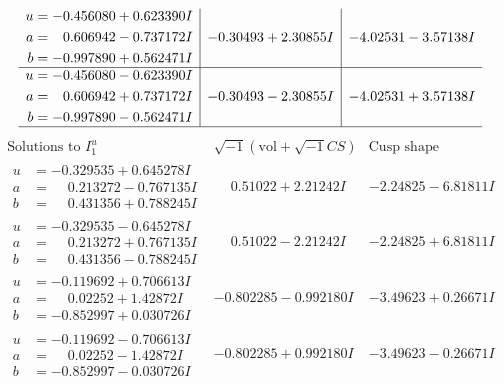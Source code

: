 \documentclass[1p]{elsarticle_modified}
\theoremstyle{definition}
\newcommand{\I}{\sqrt{-1}}
\begin{document}
$$\begin{array}{c|c|c}
\begin{aligned}
u &= -0.456080 + 0.623390 I \\
a &= \phantom{-}0.606942 - 0.737172 I \\
b &= -0.997890 + 0.562471 I\end{aligned}
 & -0.30493 + 2.30855 I & -4.02531 - 3.57138 I \\ \hline\begin{aligned}
u &= -0.456080 - 0.623390 I \\
a &= \phantom{-}0.606942 + 0.737172 I \\
b &= -0.997890 - 0.562471 I\end{aligned}
 & -0.30493 - 2.30855 I & -4.02531 + 3.57138 I\\
 \hline 
 \end{array}$$\newpage$$\begin{array}{c|c|c}  
\text{Solutions to }I^u_{1}& \I (\text{vol} + \sqrt{-1}CS) & \text{Cusp shape}\\
 \hline 
\begin{aligned}
u &= -0.329535 + 0.645278 I \\
a &= \phantom{-}0.213272 - 0.767135 I \\
b &= \phantom{-}0.431356 + 0.788245 I\end{aligned}
 & \phantom{-}0.51022 + 2.21242 I & -2.24825 - 6.81811 I \\ \hline\begin{aligned}
u &= -0.329535 - 0.645278 I \\
a &= \phantom{-}0.213272 + 0.767135 I \\
b &= \phantom{-}0.431356 - 0.788245 I\end{aligned}
 & \phantom{-}0.51022 - 2.21242 I & -2.24825 + 6.81811 I \\ \hline\begin{aligned}
u &= -0.119692 + 0.706613 I \\
a &= \phantom{-}0.02252 + 1.42872 I \\
b &= -0.852997 + 0.030726 I\end{aligned}
 & -0.802285 - 0.992180 I & -3.49623 + 0.26671 I \\ \hline\begin{aligned}
u &= -0.119692 - 0.706613 I \\
a &= \phantom{-}0.02252 - 1.42872 I \\
b &= -0.852997 - 0.030726 I\end{aligned}
 & -0.802285 + 0.992180 I & -3.49623 - 0.26671 I \\ \hline\begin{aligned}

\end{aligned}
\end{array}$$
\end{document}
